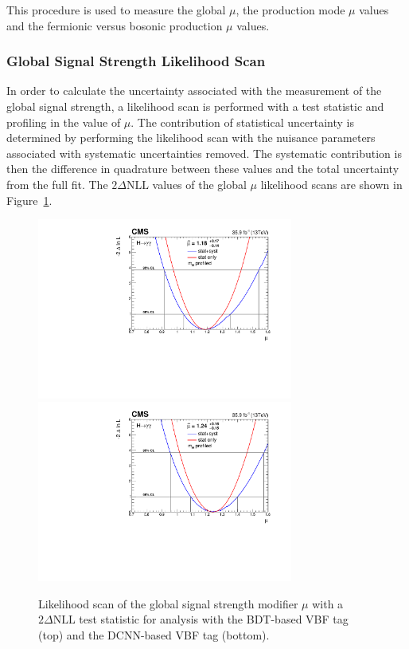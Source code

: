 This procedure is used to measure the global $\mu$, the production mode $\mu$ values and the fermionic versus bosonic production $\mu$ values. 

\subsubsection{Global Signal Strength Likelihood Scan}
In order to calculate the uncertainty associated with the measurement of the global signal strength, a likelihood scan is performed with a test statistic and profiling in the value of $\mu$.
The contribution of statistical uncertainty is determined by performing the likelihood scan with the nuisance parameters associated with systematic uncertainties removed. 
The systematic contribution is then the difference in quadrature between these values and the total uncertainty from the full fit. 
The $2\Delta{\mathrm{NLL}}$ values of the global $\mu$ likelihood scans are shown in Figure~\ref{fig:stats_results:global_mu_scan}.
\begin{figure}[h!]
    \begin{center}
        \includegraphics[width=0.75\textwidth]{figures/stats_results/CMS-HIG-16-040_Figure_016.pdf}
        \includegraphics[width=0.75\textwidth]{figures/stats_results/MuScanProfileMH.pdf}
    \end{center}
    \caption{Likelihood scan of the global signal strength modifier $\mu$ with a $2\Delta{\mathrm{NLL}}$ test statistic for analysis with the BDT-based VBF tag (top) and the DCNN-based VBF tag (bottom).}
        \label{fig:stats_results:global_mu_scan}
\end{figure}


